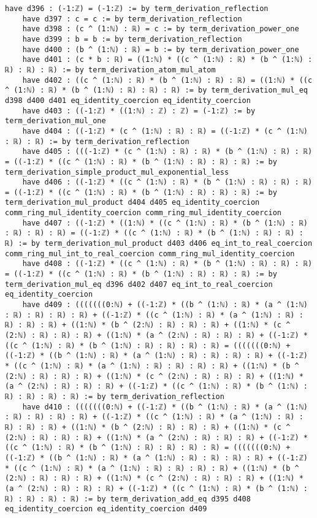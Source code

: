 \documentclass{article}
\begin{document}
\begin{tcolorbox}[colback=white!10, width=\linewidth]
\begin{lstlisting}[language=Lean4]
    have d396 : (-1:ℤ) = (-1:ℤ) := by term_derivation_reflection
    have d397 : c = c := by term_derivation_reflection
    have d398 : (c ^ (1:ℕ) : ℝ) = c := by term_derivation_power_one
    have d399 : b = b := by term_derivation_reflection
    have d400 : (b ^ (1:ℕ) : ℝ) = b := by term_derivation_power_one
    have d401 : (c * b : ℝ) = ((1:ℕ) * ((c ^ (1:ℕ) : ℝ) * (b ^ (1:ℕ) : ℝ) : ℝ) : ℝ) := by term_derivation_atom_mul_atom
    have d402 : ((c ^ (1:ℕ) : ℝ) * (b ^ (1:ℕ) : ℝ) : ℝ) = ((1:ℕ) * ((c ^ (1:ℕ) : ℝ) * (b ^ (1:ℕ) : ℝ) : ℝ) : ℝ) := by term_derivation_mul_eq d398 d400 d401 eq_identity_coercion eq_identity_coercion
    have d403 : ((-1:ℤ) * ((1:ℕ) : ℤ) : ℤ) = (-1:ℤ) := by term_derivation_mul_one
    have d404 : ((-1:ℤ) * (c ^ (1:ℕ) : ℝ) : ℝ) = ((-1:ℤ) * (c ^ (1:ℕ) : ℝ) : ℝ) := by term_derivation_reflection
    have d405 : (((-1:ℤ) * (c ^ (1:ℕ) : ℝ) : ℝ) * (b ^ (1:ℕ) : ℝ) : ℝ) = ((-1:ℤ) * ((c ^ (1:ℕ) : ℝ) * (b ^ (1:ℕ) : ℝ) : ℝ) : ℝ) := by term_derivation_simple_product_mul_exponential_less
    have d406 : ((-1:ℤ) * ((c ^ (1:ℕ) : ℝ) * (b ^ (1:ℕ) : ℝ) : ℝ) : ℝ) = ((-1:ℤ) * ((c ^ (1:ℕ) : ℝ) * (b ^ (1:ℕ) : ℝ) : ℝ) : ℝ) := by term_derivation_mul_product d404 d405 eq_identity_coercion comm_ring_mul_identity_coercion comm_ring_mul_identity_coercion
    have d407 : ((-1:ℤ) * ((1:ℕ) * ((c ^ (1:ℕ) : ℝ) * (b ^ (1:ℕ) : ℝ) : ℝ) : ℝ) : ℝ) = ((-1:ℤ) * ((c ^ (1:ℕ) : ℝ) * (b ^ (1:ℕ) : ℝ) : ℝ) : ℝ) := by term_derivation_mul_product d403 d406 eq_int_to_real_coercion comm_ring_mul_int_to_real_coercion comm_ring_mul_identity_coercion
    have d408 : ((-1:ℤ) * ((c ^ (1:ℕ) : ℝ) * (b ^ (1:ℕ) : ℝ) : ℝ) : ℝ) = ((-1:ℤ) * ((c ^ (1:ℕ) : ℝ) * (b ^ (1:ℕ) : ℝ) : ℝ) : ℝ) := by term_derivation_mul_eq d396 d402 d407 eq_int_to_real_coercion eq_identity_coercion
    have d409 : (((((((0:ℕ) + ((-1:ℤ) * ((b ^ (1:ℕ) : ℝ) * (a ^ (1:ℕ) : ℝ) : ℝ) : ℝ) : ℝ) + ((-1:ℤ) * ((c ^ (1:ℕ) : ℝ) * (a ^ (1:ℕ) : ℝ) : ℝ) : ℝ) : ℝ) + ((1:ℕ) * (b ^ (2:ℕ) : ℝ) : ℝ) : ℝ) + ((1:ℕ) * (c ^ (2:ℕ) : ℝ) : ℝ) : ℝ) + ((1:ℕ) * (a ^ (2:ℕ) : ℝ) : ℝ) : ℝ) + ((-1:ℤ) * ((c ^ (1:ℕ) : ℝ) * (b ^ (1:ℕ) : ℝ) : ℝ) : ℝ) : ℝ) = (((((((0:ℕ) + ((-1:ℤ) * ((b ^ (1:ℕ) : ℝ) * (a ^ (1:ℕ) : ℝ) : ℝ) : ℝ) : ℝ) + ((-1:ℤ) * ((c ^ (1:ℕ) : ℝ) * (a ^ (1:ℕ) : ℝ) : ℝ) : ℝ) : ℝ) + ((1:ℕ) * (b ^ (2:ℕ) : ℝ) : ℝ) : ℝ) + ((1:ℕ) * (c ^ (2:ℕ) : ℝ) : ℝ) : ℝ) + ((1:ℕ) * (a ^ (2:ℕ) : ℝ) : ℝ) : ℝ) + ((-1:ℤ) * ((c ^ (1:ℕ) : ℝ) * (b ^ (1:ℕ) : ℝ) : ℝ) : ℝ) : ℝ) := by term_derivation_reflection
    have d410 : (((((((0:ℕ) + ((-1:ℤ) * ((b ^ (1:ℕ) : ℝ) * (a ^ (1:ℕ) : ℝ) : ℝ) : ℝ) : ℝ) + ((-1:ℤ) * ((c ^ (1:ℕ) : ℝ) * (a ^ (1:ℕ) : ℝ) : ℝ) : ℝ) : ℝ) + ((1:ℕ) * (b ^ (2:ℕ) : ℝ) : ℝ) : ℝ) + ((1:ℕ) * (c ^ (2:ℕ) : ℝ) : ℝ) : ℝ) + ((1:ℕ) * (a ^ (2:ℕ) : ℝ) : ℝ) : ℝ) + ((-1:ℤ) * ((c ^ (1:ℕ) : ℝ) * (b ^ (1:ℕ) : ℝ) : ℝ) : ℝ) : ℝ) = (((((((0:ℕ) + ((-1:ℤ) * ((b ^ (1:ℕ) : ℝ) * (a ^ (1:ℕ) : ℝ) : ℝ) : ℝ) : ℝ) + ((-1:ℤ) * ((c ^ (1:ℕ) : ℝ) * (a ^ (1:ℕ) : ℝ) : ℝ) : ℝ) : ℝ) + ((1:ℕ) * (b ^ (2:ℕ) : ℝ) : ℝ) : ℝ) + ((1:ℕ) * (c ^ (2:ℕ) : ℝ) : ℝ) : ℝ) + ((1:ℕ) * (a ^ (2:ℕ) : ℝ) : ℝ) : ℝ) + ((-1:ℤ) * ((c ^ (1:ℕ) : ℝ) * (b ^ (1:ℕ) : ℝ) : ℝ) : ℝ) : ℝ) := by term_derivation_add_eq d395 d408 eq_identity_coercion eq_identity_coercion d409

\end{lstlisting}
\end{tcolorbox}
\end{document}
